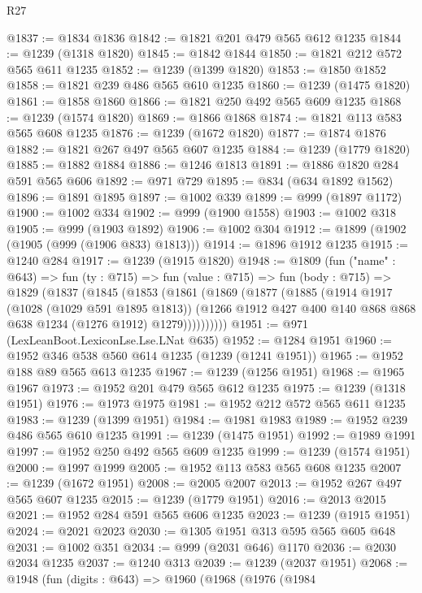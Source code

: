 \begin{lexlean}{R27}
\begin{coremodule}
@1837 := @1834 @1836
@1842 := @1821 @201 @479 @565 @612 @1235
@1844 := @1239 (@1318 @1820)
@1845 := @1842 @1844
@1850 := @1821 @212 @572 @565 @611 @1235
@1852 := @1239 (@1399 @1820)
@1853 := @1850 @1852
@1858 := @1821 @239 @486 @565 @610 @1235
@1860 := @1239 (@1475 @1820)
@1861 := @1858 @1860
@1866 := @1821 @250 @492 @565 @609 @1235
@1868 := @1239 (@1574 @1820)
@1869 := @1866 @1868
@1874 := @1821 @113 @583 @565 @608 @1235
@1876 := @1239 (@1672 @1820)
@1877 := @1874 @1876
@1882 := @1821 @267 @497 @565 @607 @1235
@1884 := @1239 (@1779 @1820)
@1885 := @1882 @1884
@1886 := @1246 @1813
@1891 := @1886 @1820 @284 @591 @565 @606
@1892 := @971 @729
@1895 := @834 (@634 @1892 @1562)
@1896 := @1891 @1895
@1897 := @1002 @339
@1899 := @999 (@1897 @1172)
@1900 := @1002 @334
@1902 := @999 (@1900 @1558)
@1903 := @1002 @318
@1905 := @999 (@1903 @1892)
@1906 := @1002 @304
@1912 := @1899 (@1902 (@1905 (@999 (@1906 @833) @1813)))
@1914 := @1896 @1912 @1235
@1915 := @1240 @284
@1917 := @1239 (@1915 @1820)
@1948 := @1809
    (fun ("name" : @643) =>
    fun (ty : @715) =>
    fun (value : @715) =>
    fun (body : @715) =>
    @1829
      (@1837
        (@1845
          (@1853
            (@1861
              (@1869
                (@1877
                  (@1885
                    (@1914
                      @1917
                      (@1028 (@1029 @591 @1895 @1813))
                      (@1266 @1912 @427 @400 @140 @868 @868 @638 @1234 (@1276 @1912) @1279))))))))))
@1951 := @971 (LexLeanBoot.LexiconLse.Lse.LNat @635)
@1952 := @1284 @1951
@1960 := @1952 @346 @538 @560 @614 @1235 (@1239 (@1241 @1951))
@1965 := @1952 @188 @89 @565 @613 @1235
@1967 := @1239 (@1256 @1951)
@1968 := @1965 @1967
@1973 := @1952 @201 @479 @565 @612 @1235
@1975 := @1239 (@1318 @1951)
@1976 := @1973 @1975
@1981 := @1952 @212 @572 @565 @611 @1235
@1983 := @1239 (@1399 @1951)
@1984 := @1981 @1983
@1989 := @1952 @239 @486 @565 @610 @1235
@1991 := @1239 (@1475 @1951)
@1992 := @1989 @1991
@1997 := @1952 @250 @492 @565 @609 @1235
@1999 := @1239 (@1574 @1951)
@2000 := @1997 @1999
@2005 := @1952 @113 @583 @565 @608 @1235
@2007 := @1239 (@1672 @1951)
@2008 := @2005 @2007
@2013 := @1952 @267 @497 @565 @607 @1235
@2015 := @1239 (@1779 @1951)
@2016 := @2013 @2015
@2021 := @1952 @284 @591 @565 @606 @1235
@2023 := @1239 (@1915 @1951)
@2024 := @2021 @2023
@2030 := @1305 @1951 @313 @595 @565 @605 @648
@2031 := @1002 @351
@2034 := @999 (@2031 @646) @1170
@2036 := @2030 @2034 @1235
@2037 := @1240 @313
@2039 := @1239 (@2037 @1951)
@2068 := @1948
    (fun (digits : @643) =>
    @1960
      (@1968
        (@1976
          (@1984

\end{coremodule}
\end{lexlean}

